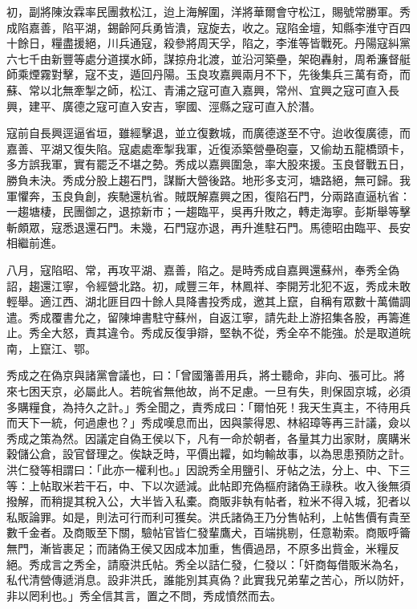 \begin{pinyinscope}
初，副將陳汝霖率民團救松江，迨上海解圍，洋將華爾會守松江，賜號常勝軍。秀成陷嘉善，陷平湖，錫齡阿兵勇皆潰，寇旋去，收之。寇陷金壇，知縣李淮守百四十餘日，糧盡援絕，川兵通寇，殺參將周天孚，陷之，李淮等皆戰死。丹陽寇糾黨六七千由新豐等處分道撲水師，謀掠舟北渡，並沿河築壘，架砲轟射，周希濂督艇師乘煙霧對擊，寇不支，遁回丹陽。玉良攻嘉興兩月不下，先後集兵三萬有奇，而蘇、常以北無牽掣之師，松江、青浦之寇可直入嘉興，常州、宜興之寇可直入長興，建平、廣德之寇可直入安吉，寧國、涇縣之寇可直入於潛。

寇前自長興逕逼省垣，雖經擊退，並立復數城，而廣德遂至不守。迨收復廣德，而嘉善、平湖又復失陷。寇處處牽掣我軍，近復添築營壘砲臺，又偷劫五龍橋頭卡，多方誤我軍，實有罷乏不堪之勢。秀成以嘉興圍急，率大股來援。玉良督戰五日，勝負未決。秀成分股上趨石門，謀斷大營後路。地形多支河，塘路絕，無可歸。我軍懼奔，玉良負創，疾馳還杭省。賊既解嘉興之困，復陷石門，分兩路直逼杭省：一趨塘棲，民團御之，退掠新市；一趨臨平，吳再升敗之，轉走海寧。彭斯舉等擊斬頗眾，寇悉退還石門。未幾，石門寇亦退，再升進駐石門。馬德昭由臨平、長安相繼前進。

八月，寇陷昭、常，再攻平湖、嘉善，陷之。是時秀成自嘉興還蘇州，奉秀全偽詔，趨還江寧，令經營北路。初，咸豐三年，林鳳祥、李開芳北犯不返，秀成未敢輕舉。適江西、湖北匪目四十餘人具降書投秀成，邀其上竄，自稱有眾數十萬備調遣。秀成覆書允之，留陳坤書駐守蘇州，自返江寧，請先赴上游招集各股，再籌進止。秀全大怒，責其違令。秀成反復爭辯，堅執不從，秀全卒不能強。於是取道皖南，上竄江、鄂。

秀成之在偽京與諸黨會議也，曰：「曾國籓善用兵，將士聽命，非向、張可比。將來七困天京，必屬此人。若皖省無他故，尚不足慮。一旦有失，則保固京城，必須多購糧食，為持久之計。」秀全聞之，責秀成曰：「爾怕死！我天生真主，不待用兵而天下一統，何過慮也？」秀成嘆息而出，因與蒙得恩、林紹璋等再三計議，僉以秀成之策為然。因議定自偽王侯以下，凡有一命於朝者，各量其力出家財，廣購米穀儲公倉，設官督理之。俟缺乏時，平價出糶，如均輸故事，以為思患預防之計。洪仁發等相謂曰：「此亦一權利也。」因說秀全用鹽引、牙帖之法，分上、中、下三等：上帖取米若干石，中、下以次遞減。此帖即充偽樞府諸偽王祿秩。收入後無須撥解，而稍提其稅入公，大半皆入私橐。商販非執有帖者，粒米不得入城，犯者以私販論罪。如是，則法可行而利可獲矣。洪氏諸偽王乃分售帖利，上帖售價有貴至數千金者。及商販至下關，驗帖官皆仁發輩鷹犬，百端挑剔，任意勒索。商販呼籥無門，漸皆裹足；而諸偽王侯又因成本加重，售價過昂，不原多出貲金，米糧反絕。秀成言之秀全，請廢洪氏帖。秀全以詰仁發，仁發以：「奸商每借販米為名，私代清營傳遞消息。設非洪氏，誰能別其真偽？此實我兄弟輩之苦心，所以防奸，非以罔利也。」秀全信其言，置之不問，秀成憤然而去。


\end{pinyinscope}
